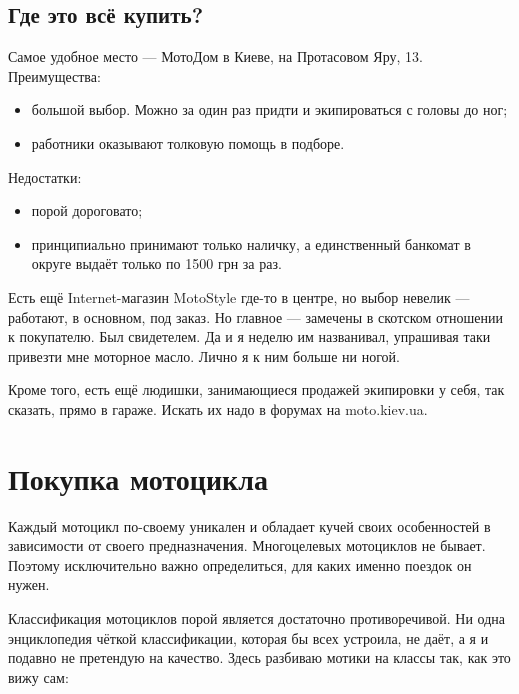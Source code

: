 \documentclass[12pt,a4paper]{article}
\begin{document}
\subsection{Где это всё купить?}

Самое удобное место --- МотоДом в Киеве, на Протасовом Яру, 13.
Преимущества:

\begin{itemize}
\item большой выбор. Можно за один раз придти и экипироваться с головы
до ног;
\item работники оказывают толковую помощь в подборе.
\end{itemize}

Недостатки:

\begin{itemize}
\item порой дороговато;
\item принципиально принимают только наличку, а единственный банкомат
в округе выдаёт только по 1500 грн за раз.
\end{itemize}

Есть ещё Internet-магазин MotoStyle где-то в центре, но выбор невелик ---
работают, в основном, под заказ. Но главное --- замечены в скотском
отношении к покупателю. Был свидетелем. Да и я неделю им названивал,
упрашивая таки привезти мне моторное масло. Лично я к ним больше ни
ногой.

Кроме того, есть ещё людишки, занимающиеся продажей экипировки у себя,
так сказать, прямо в гараже. Искать их надо в форумах на moto.kiev.ua.

\section{Покупка мотоцикла}

Каждый мотоцикл по-своему уникален и обладает кучей своих особенностей
в зависимости от своего предназначения. Многоцелевых мотоциклов не
бывает. Поэтому исключительно важно определиться, для каких именно
поездок он нужен.

Классификация мотоциклов порой является достаточно противоречивой.
Ни одна энциклопедия чёткой классификации, которая бы всех устроила,
не даёт, а я и подавно не претендую на качество. Здесь разбиваю
мотики на классы так, как это вижу сам:
\end{document}
